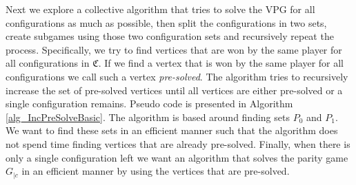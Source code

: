 Next we explore a collective algorithm that tries to solve the VPG for all configurations as much as possible, then split the configurations in two sets, create subgames using those two configuration sets and recursively repeat the process. Specifically, we try to find vertices that are won by the same player for all configurations in $\mathfrak{C}$. If we find a vertex that is won by the same player for all configurations we call such a vertex \textit{pre-solved}. The algorithm tries to recursively increase the set of pre-solved vertices until all vertices are either pre-solved or a single configuration remains. Pseudo code is presented in Algorithm \ref{alg_IncPreSolveBasic}. The algorithm is based around finding sets $P_0$ and $P_1$. We want to find these sets in an efficient manner such that the algorithm does not spend time finding vertices that are already pre-solved. Finally, when there is only a single configuration left we want an algorithm that solves the parity game $G_{|c}$ in an efficient manner by using the vertices that are pre-solved.


